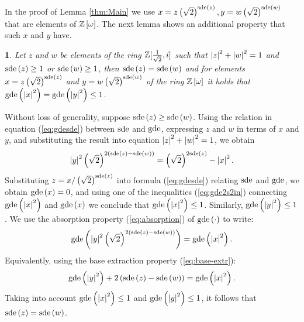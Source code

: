 \documentclass[english,journal]{extarticle}
\makeatletter
\theoremstyle{plain}
\theoremstyle{plain}
\theoremstyle{plain}
\newtheorem{lem}{\protect\lemmaname}
\theoremstyle{definition}
\theoremstyle{plain}
\newenvironment{proof}[1][\proofname]{\par
     \normalfont\topsep6\p@\@plus6\p@\relax
     \trivlist
     \itemindent\parindent
     \item[\hskip\labelsep
           \scshape
       #1]\ignorespaces
   }{%
     \endtrivlist\@endpefalse
   }
\providecommand{\proofname}{Proof}
\theoremstyle{plain}
\providecommand{\lemmaname}{\inputencoding{latin9}Lemma}
\makeatother
\begin{document}
In the proof of Lemma \ref{thm:Main} we use
$x=z\left(\sqrt{2}\right)^{\mathrm{sde}\left(z\right)},y=w\left(\sqrt{2}\right)^{
\mathrm{sde}\left(w\right)}$
that are elements of $\mathbb{Z}\left[\omega\right]$. The next lemma shows an additional
property that such $x$ and $y$ have.
\begin{lem}
\label{lem:sde}Let $z$ and $w$ be elements of the ring $\mathbb{Z}[\frac{1}{\sqrt{2}},i]$ such that
$\left|z\right|^{2}+\left|w\right|^{2}=1$ and $\mathrm{sde}\left(z\right)\ge 1$ or
$\mathrm{sde}\left(w\right)\ge 1$,
then $\mathrm{sde}\left(z\right)=\mathrm{sde}\left(w\right)$ and for elements  $x=z\left(\sqrt{2}\right)^{\mathrm{sde}\left(z\right)}$ and 
$y=w\left(\sqrt{2}\right)^{\mathrm{sde}\left(w\right)}$ of the ring $\mathbb{Z}\left[\omega\right]$
it holds that $\mathbf{\mathrm{gde}}\left(\left|x\right|^{2}\right)=\mathbf{\mathrm{gde}}\left(\left|y\right|^{2}\right)\le 1$.\end{lem}
\begin{proof}
Without loss of generality, suppose $\mathrm{sde}\left(z\right)\ge\mathrm{sde}\left(w\right)$.
Using the relation in equation (\ref{eq:gdesde}) between $\mathrm{sde}$
and $\mathbf{\mathrm{gde}}$, expressing $z$ and $w$ in terms of $x$ and $y$, and substituting
the result into equation $\left|z\right|^{2}+\left|w\right|^{2}=1$, we obtain 
\[
\left|y\right|^{2}\left(\sqrt{2}\right)^{2\left(\mathrm{sde}\left(z\right)-\mathrm{sde}\left(w\right)\right)}
=\left(\sqrt{2}\right)^{2\mathrm{sde}\left(z\right)}-\left|x\right|^{2}.
\]
Substituting $z=x/\left(\sqrt{2}\right)^{\mathrm{sde}\left(z\right)}$ into
formula (\ref{eq:gdesde}) relating $\mathrm{sde}$ and $\mathbf{\mathrm{gde}}$, we obtain
$\mathbf{\mathrm{gde}}\left(x\right)=0$, and using one of the inequalities (\ref{eq:gde2s2in})
connecting $\mathbf{\mathrm{gde}}\left(\left|x\right|^{2}\right)$ and $\mathbf{\mathrm{gde}}\left(x\right)$
we conclude that $\mathbf{\mathrm{gde}}\left(\left|x\right|^{2}\right)\le 1$.  Similarly,
$\mathbf{\mathrm{gde}}\left(\left|y\right|^{2}\right)\le 1$. We use the absorption property
(\ref{eq:absorption}) of $\mathbf{\mathrm{gde}}\left(\cdot\right)$ to write: 
\[
\mathbf{\mathrm{gde}}\left(\left|y\right|^{2}\left(\sqrt{2}\right)^{2\left(\mathrm{sde}\left(z\right)-\mathrm{sde}\left(w\right)\right)}
\right)=\mathbf{\mathrm{gde}}\left(\left|x\right|^{2}\right).
\]
Equivalently, using the base extraction property (\ref{eq:base-extr}):
\[
\mathbf{\mathrm{gde}}\left(\left|y\right|^{2}\right)+2\left(\mathrm{sde}\left(z\right)-\mathrm{sde}\left(w\right)\right)=\mathbf{\mathrm{gde}}\left(\left|x\right|^{2}\right).
\]
Taking into account $\mathbf{\mathrm{gde}}\left(\left|x\right|^{2}\right)\le 1$ and $\mathbf{\mathrm{gde}}\left(\left|y\right|^{2}\right)\le 1$,
it follows that $\mathrm{sde}\left(z\right)=\mathrm{sde}\left(w\right)$.
\end{proof}
\end{document}
